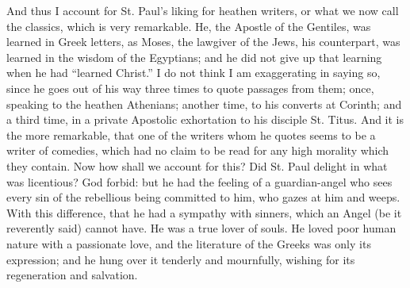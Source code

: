 And thus I account for St. Paul's liking for heathen
writers, or what we now call the classics, which is very
remarkable. He, the Apostle of the Gentiles, was learned
in Greek letters, as Moses, the lawgiver of the Jews, his
counterpart, was learned in the wisdom of the Egyptians;
and he did not give up that learning when he had
``learned Christ.'' I do not think I am
exaggerating in saying so, since he goes out of his way
three times to quote passages from them; once, speaking
to the heathen Athenians; another time, to his converts
at Corinth; and a third time, in a private Apostolic
exhortation to his disciple St. Titus. And it is the more
remarkable, that one of the writers whom he quotes seems
to be a writer of comedies, which had no claim to be read
for any high morality which they contain. Now how shall
we account for this? Did St. Paul delight in what was
licentious? God forbid: but he had the feeling of a
guardian-angel who sees every sin of the rebellious being committed to him, who gazes at him and weeps. With this
difference, that he had a sympathy with sinners, which an
Angel (be it reverently said) cannot have. He was a true
lover of souls. He loved poor human nature with a
passionate love, and the literature of the Greeks was
only its expression; and he hung over it tenderly and
mournfully, wishing for its regeneration and salvation.

